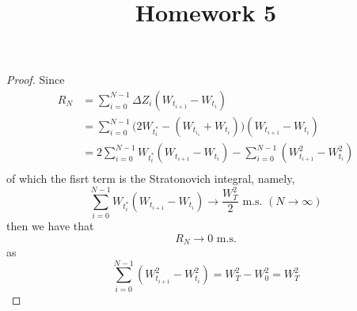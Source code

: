 \documentclass{homework}
\title{Homework 5}
\begin{document}
    \maketitle

    \problem

    \problem
    \begin{proof}
        Since
        \[\begin{aligned}
            R_N&=\sum_{i=0}^{N-1}\Delta Z_i(W_{t_{i+1}}-W_{t_i})\\
            &=\sum_{i=0}^{N-1}\big(2W_{t_i^*}-(W_{t_{i_1}}+W_{t_i})
              \big)(W_{t_{i+1}}-W_{t_i})\\ 
            &=2\sum_{i=0}^{N-1}W_{t^*_i}(W_{t_{i+1}}-W_{t_i})
              -\sum_{i=0}^{N-1}(W_{t_{i+1}}^2-W_{t_i}^2)\\
        \end{aligned}\]
        of which the fisrt term is the Stratonovich integral, namely,
        \[\sum_{i=0}^{N-1}W_{t_i^*}(W_{t_{i+1}}-W_{t_i})\to\frac{W_T^2}{2}
        \text{ m.s. }(N\to\infty)\]
        then we have that
        \[R_N\to 0\text{ m.s.}\]
        as
        \[\sum_{i=0}^{N-1}(W_{t_{i+1}}^2-W_{t_i}^2)=W_T^2-W_0^2=W_T^2\]
    \end{proof}
\end{document}

